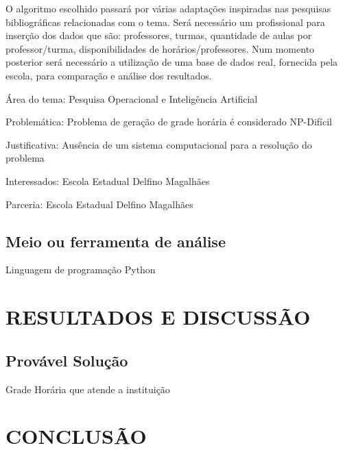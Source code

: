 \documentclass[12pt,fleqn]{article}
\begin{document}
O algoritmo escolhido passará por várias adaptações inspiradas nas pesquisas bibliográficas relacionadas com o tema. Será necessário um profissional para inserção dos dados que são: professores, turmas, quantidade de aulas por professor/turma, disponibilidades de horários/professores. Num momento posterior será necessário a utilização de uma base de dados real, fornecida pela escola, para comparação e análise dos resultados.

Área do tema: Pesquisa Operacional e Inteligência Artificial

Problemática: Problema de geração de grade horária é considerado NP-Difícil

Justificativa: Ausência de um sistema computacional para a resolução do problema

Interessados: Escola Estadual Delfino Magalhães

Parceria: Escola Estadual Delfino Magalhães

\subsection{Meio ou ferramenta de análise}
Linguagem de programação Python

\section{RESULTADOS E DISCUSSÃO}

\subsection{Provável Solução}
Grade Horária que atende a instituição

\section{CONCLUSÃO}
\end{document}
